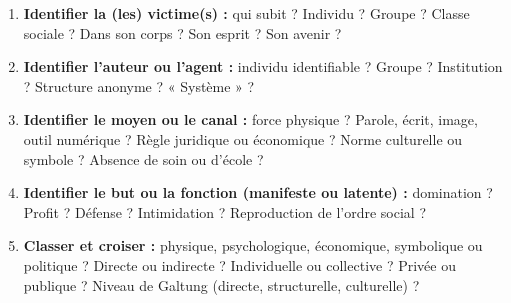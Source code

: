 \documentclass[11pt]{article}
\begin{document}
\begin{methode}
\begin{enumerate}
    \item \textbf{Identifier la (les) victime(s) :} qui subit ? Individu ? Groupe ? Classe sociale ? Dans son corps ? Son esprit ? Son avenir ?
    \item \textbf{Identifier l'auteur ou l'agent :} individu identifiable ? Groupe ? Institution ? Structure anonyme ? « Système » ?
    \item \textbf{Identifier le moyen ou le canal :} force physique ? Parole, écrit, image, outil numérique ? Règle juridique ou économique ? Norme culturelle ou symbole ? Absence de soin ou d'école ?
    \item \textbf{Identifier le but ou la fonction (manifeste ou latente) :} domination ? Profit ? Défense ? Intimidation ? Reproduction de l'ordre social ?
    \item \textbf{Classer et croiser :} physique, psychologique, économique, symbolique ou politique ? Directe ou indirecte ? Individuelle ou collective ? Privée ou publique ? Niveau de Galtung (directe, structurelle, culturelle) ?
\end{enumerate}
\end{methode}
\end{document}
